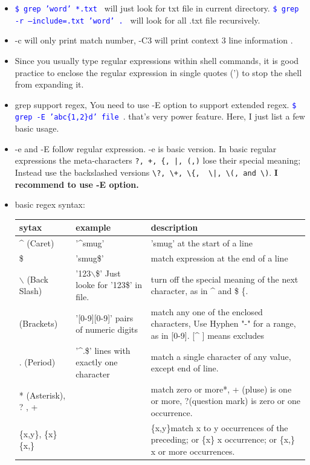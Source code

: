 \documentclass[a4paper,12pt,twoside]{book}
\newcommand{\linuxcommand}[1]{\texttt{\textcolor{blue}{\$ #1 \Pisymbol{psy}{191}}}}
\begin{document}
\begin{itemize}
		\item \linuxcommand{grep 'word' *.txt} will just look for txt file in current directory. \linuxcommand{grep -r --include=\*.txt 'word' .} will look for all .txt file recursively.  

		\item -c will only print  match number, -C3 will print context 3 line information .  

		\item Since you usually type regular expressions within shell commands, it is good practice to enclose the regular expression in single quotes (') to stop the shell from expanding it. 

		\item grep support regex, You need to use -E option to support extended regex. \linuxcommand{grep -E 'abc\{1,2\}d' file}.  that's very power feature. Here, I just list a few basic usage. 

		\item -e and -E follow regular expression. -e is basic version. In basic regular expressions the meta-characters \verb=?, +, {, |, (,)= lose their special meaning; Instead use the backslashed versions \verb=\?, \+, \{,  \|, \(, and \)=. \textbf{I recommend to use -E option.}

		\item basic regex syntax:

 \begin{tabular}{p{}|p{}|p{}}
\hline 
sytax 	& example & 	description \\

\hline 
\^{} (Caret)	& '\^{}smug'  & 	'smug' at the start of a line \\
\hline 
\$ &  'smug\$' & 	match expression at the end of a line\\
\hline 
$\backslash$ (Back Slash)&   '123$\backslash$\$'  Just looke for '123\$' in file. &	turn off the special meaning of the next character, as in \^{} and \$ \{.   \\
\hline 
[ ] (Brackets)	&'[0-9][0-9]' pairs of numeric digits &	match any one of the enclosed characters,  Use Hyphen "-" for a range, as in [0-9].  [\^{} ] means excludes\\
\hline 
. (Period) & '\^{}.\$' lines with exactly one character  &	match a single character of any value, except end of line. \\
\hline 
* (Asterisk), ? , + &  &	match zero or more*,  + (pluse) is one or more,   ?(question mark) is zero or one occurrence.   \\
\hline 
\{x,y\}, 	\{x\}	\{x,\} & &	\{x,y\}match x to y occurrences of the preceding;  or \{x\} x occurrence; or  \{x,\} x or more occurrences. \\
\hline 


\end{tabular}
\end{itemize}
\end{document}
